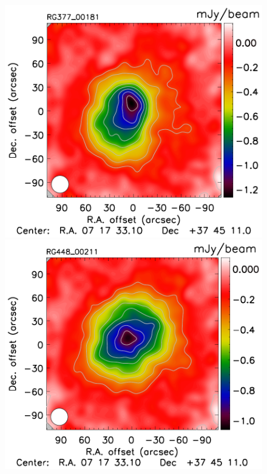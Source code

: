 \documentclass[twocolumn,traditabstract]{aa}
\begin{document}
\begin{figure}[h]
\includegraphics[trim=0cm 0.7cm 0cm 0cm, clip=true, totalheight=3.7cm]{Figure/Map_RG377_00181_Ymap_zobs0p5_processed.pdf}
\includegraphics[trim=0cm 0.7cm 0cm 0cm, clip=true, totalheight=3.7cm]{Figure/Map_RG448_00211_Ymap_zobs0p4_processed.pdf}

\end{figure}
\end{document}
